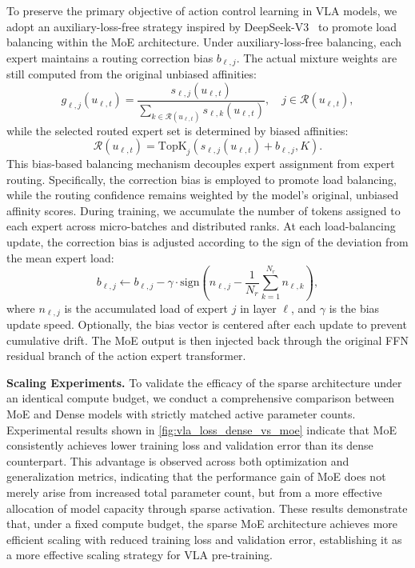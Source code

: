 To preserve the primary objective of action control learning in VLA models, we adopt an auxiliary-loss-free strategy inspired by DeepSeek-V3~\cite{liu2024deepseek} to promote load balancing within the MoE architecture.
Under auxiliary-loss-free balancing, each expert maintains a routing correction bias $b_{\ell,j}$. The actual mixture weights are still computed from the original unbiased affinities:
\begin{equation}
g_{\ell,j}(u_{\ell,t}) =
\frac{s_{\ell,j}(u_{\ell,t})}
{\sum_{k \in \mathcal{R}(u_{\ell,t})} s_{\ell,k}(u_{\ell,t})},
\quad j \in \mathcal{R}(u_{\ell,t}),
\end{equation}
while the selected routed expert set is determined by biased affinities:
\begin{equation}
\mathcal{R}(u_{\ell,t}) =
\mathrm{TopK}_{j}
\left(
s_{\ell,j}(u_{\ell,t}) + b_{\ell,j}, K
\right).
\end{equation}
This bias-based balancing mechanism decouples expert assignment from expert routing. Specifically, the correction bias is employed to promote load balancing, while the routing confidence remains weighted by the model's original, unbiased affinity scores.
During training, we accumulate the number of tokens assigned to each expert across micro-batches and distributed ranks. At each load-balancing update, the correction bias is adjusted according to the sign of the deviation from the mean expert load:
\begin{equation}
b_{\ell,j} \leftarrow
b_{\ell,j}
-
\gamma \cdot
\mathrm{sign}
\left(
n_{\ell,j} - \frac{1}{N_r}\sum_{k=1}^{N_r} n_{\ell,k}
\right),
\end{equation}
where $n_{\ell,j}$ is the accumulated load of expert $j$ in layer $\ell$, and $\gamma$ is the bias update speed. Optionally, the bias vector is centered after each update to prevent cumulative drift. The MoE output is then injected back through the original FFN residual branch of the action expert transformer.

\noindent\textbf{Scaling Experiments.}
To validate the efficacy of the sparse architecture under an identical compute budget, we conduct a comprehensive comparison between MoE and Dense models with strictly matched active parameter counts. Experimental results shown in \cref{fig:vla_loss_dense_vs_moe} indicate that MoE consistently achieves lower training loss and validation error than its dense counterpart. 
This advantage is observed across both optimization and generalization metrics, indicating that the performance gain of MoE does not merely arise from increased total parameter count, but from a more effective allocation of model capacity through sparse activation. These results demonstrate that, under a fixed compute budget, the sparse MoE architecture achieves more efficient scaling with reduced training loss and validation error, establishing it as a more effective scaling strategy for VLA pre-training.



